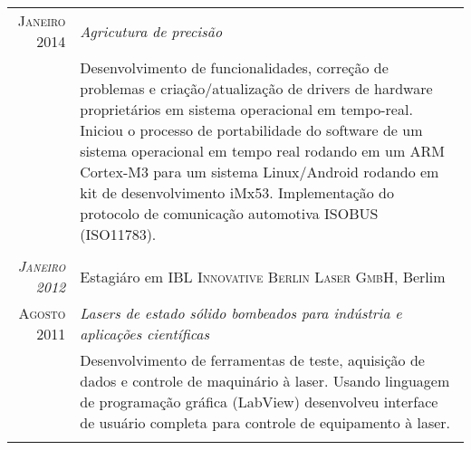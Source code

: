 \documentclass[a4paper,10pt]{article}
\begin{document}
\begin{tabular}{r|p{11cm}}
        \textsc{Janeiro 2014}        &\emph
                                     {Agricutura de precisão} \\
                                     &\footnotesize
                                     {
                                         Desenvolvimento de funcionalidades,
                                         correção de problemas e criação/atualização
                                         de drivers de hardware proprietários em sistema
                                         operacional em tempo-real. Iniciou o processo
                                         de portabilidade do software de um sistema
                                         operacional em tempo real rodando em um ARM
                                         Cortex-M3 para um sistema Linux/Android rodando
                                         em kit de desenvolvimento iMx53. Implementação
                                         do protocolo de comunicação automotiva
                                         ISOBUS (ISO11783).
                                     } \\
                                     \multicolumn{2}{c}{} \\

        \emph{\textsc{Janeiro 2012}} & Estagiáro em \textsc
                                     {IBL Innovative Berlin Laser GmbH},
                                     Berlim \\

        \textsc{Agosto 2011}         &\emph
                                     {Lasers de estado sólido bombeados para
                                            indústria e aplicações científicas} \\
                                     &\footnotesize
                                     {
                                         Desenvolvimento de ferramentas de teste,
                                         aquisição de dados e controle de maquinário
                                         à laser.  Usando linguagem de programação
                                         gráfica (LabView) desenvolveu interface de
                                         usuário completa para controle de equipamento
                                         à laser.
                                     } \\
                                     \multicolumn{2}{c}{} \\
    \end{tabular}
\end{document}
